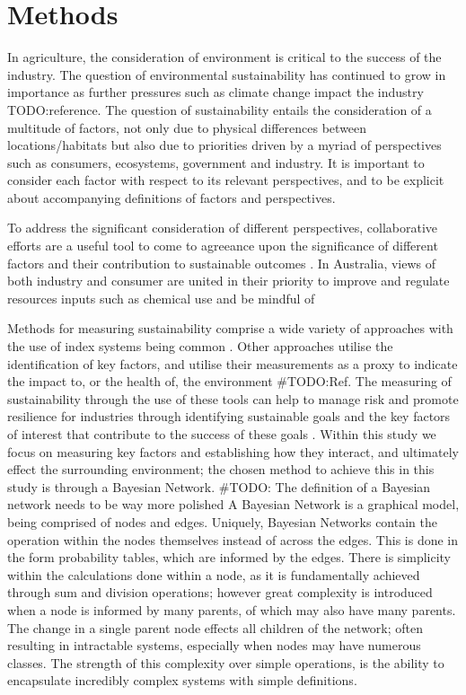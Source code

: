 \section{Methods}

In agriculture, the consideration of environment is critical to the success of the industry. The question of environmental sustainability has continued to grow in importance as further pressures such as climate change impact the industry TODO:reference. The question of sustainability entails the consideration of a multitude of factors, not only due to physical differences between locations/habitats but also due to priorities driven by a myriad of perspectives such as consumers, ecosystems, government and industry. It is important to consider each factor with respect to its relevant perspectives, and to be explicit about accompanying definitions of factors and perspectives.

To address the significant consideration of different perspectives, collaborative efforts are a useful tool to come to agreeance upon the significance of different factors and their contribution to sustainable outcomes \citep{dichiaraCollaborativeApproachAchieving2024}. In Australia, views of both industry and consumer are united in their priority to improve and regulate resources inputs such as chemical use and be mindful of \citep{dumbrellComparingAustralianPublic2024}

Methods for measuring sustainability comprise a wide variety of approaches with the use of index systems being common \citep{gehringerMappingSustainabilityMeasurement2024}. Other approaches utilise the identification of key factors, and utilise their measurements as a proxy to indicate the impact to, or the health of, the environment #TODO:Ref. The measuring of sustainability through the use of these tools can help to manage risk and promote resilience for industries through identifying sustainable goals and the key factors of interest that contribute to the success of these goals \citep{klemesAssessingMeasuringEnvironmental2015} \citep{beckerSustainabilityScienceManaging2024}. Within this study we focus on measuring key factors and establishing how they interact, and ultimately effect the surrounding environment; the chosen method to achieve this in this study is through a Bayesian Network.
#TODO: The definition of a Bayesian network needs to be way more polished
A Bayesian Network is a graphical model, being comprised of nodes and edges. Uniquely, Bayesian Networks contain the operation within the nodes themselves instead of across the edges. This is done in the form probability tables, which are informed by the edges. There is simplicity within the calculations done within a node, as it is fundamentally achieved through sum and division operations; however great complexity is introduced when a node is informed by many parents, of which may also have many parents. The change in a single parent node effects all children of the network; often resulting in intractable systems, especially when nodes may have numerous classes. The strength of this complexity over simple operations, is the ability to encapsulate incredibly complex systems with simple definitions.


